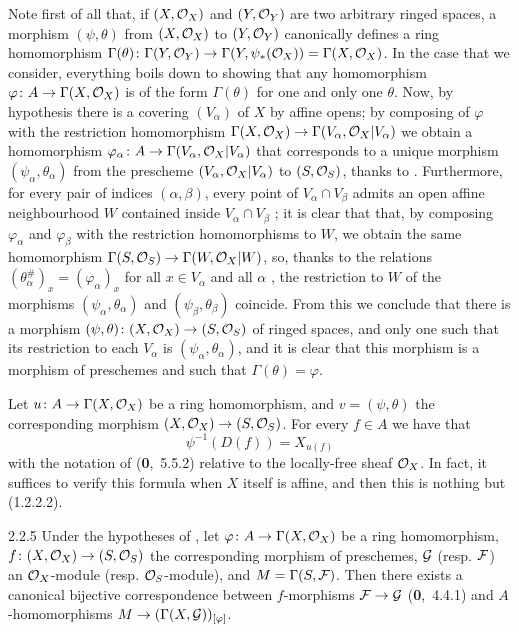 \documentclass[../main.tex]{subfiles}
\begin{document}
Note first of all that, if $(X,\mathcal{O}_X)$ and $(Y,\mathcal{O}_Y)$ are two arbitrary ringed spaces,
a morphism $(\psi,\theta)$ from $(X,\mathcal{O}_X)$ to $(Y,\mathcal{O}_Y)$ canonically defines a ring
homomorphism
$\Gamma(\theta)\colon\Gamma(Y,\mathcal{O}_Y)\to\Gamma(Y,\psi_\ast(\mathcal{O}_X))=\Gamma(X,\mathcal{O}_X)$.
In the case that we consider, everything boils down to showing that any
homomorphism $\varphi\colon A\to\Gamma(X,\mathcal{O}_X)$ is of the form $\Gamma(\theta)$
for one and only one $\theta$. Now, by hypothesis there is a covering
$(V_\alpha)$ of $X$ by affine opens; by composing of $\varphi$ with the
restriction homomorphism $\Gamma(X,\mathcal{O}_X)\to\Gamma(V_\alpha,\mathcal{O}_X|V_\alpha)$ we
obtain a homomorphism $\varphi_\alpha\colon A\to\Gamma(V_\alpha,\mathcal{O}_X|V_\alpha)$
that corresponds to a unique morphism $(\psi_\alpha,\theta_\alpha)$ from the
prescheme $(V_\alpha,\mathcal{O}_X|V_\alpha)$ to $(S,\mathcal{O}_S)$, thanks to .
Furthermore, for every pair of indices $(\alpha,\beta)$, every point of
$V_\alpha\cap V_\beta$ admits an open affine neighbourhood $W$ contained inside
$V_\alpha\cap V_\beta$ ; it is clear that that, by composing
$\varphi_\alpha$ and $\varphi_\beta$ with the restriction homomorphisms to $W$,
we obtain the same homomorphism $\Gamma(S,\mathcal{O}_S)\to\Gamma(W,\mathcal{O}_X|W)$, so, thanks
to the relations $(\theta_\alpha^\#)_x=(\varphi_\alpha)_x$ for all $x\in
V_\alpha$ and all $\alpha$ , the restriction to $W$ of the morphisms
$(\psi_\alpha,\theta_\alpha)$ and $(\psi_\beta,\theta_\beta)$ coincide. From
this we conclude that there is a morphism
$(\psi,\theta)\colon(X,\mathcal{O}_X)\to(S,\mathcal{O}_S)$ of ringed spaces, and only one such
that its restriction to each $V_\alpha$ is $(\psi_\alpha,\theta_\alpha)$, and it
is clear that this morphism is a morphism of preschemes and such that
$\Gamma(\theta)=\varphi$.

Let $u\colon A\to\Gamma(X,\mathcal{O}_X)$ be a ring homomorphism, and $v=(\psi,\theta)$
the corresponding morphism $(X,\mathcal{O}_X)\to(S,\mathcal{O}_S)$. For every $f\in A$ we have
that
\[
  \psi^{-1}(D(f))=X_{u(f)}\tag{2.2.4.1}
\]
with the notation of (\textbf{0},~5.5.2) relative to the locally-free sheaf
$\mathcal{O}_X$. In fact, it suffices to verify this formula when $X$ itself is affine,
and then this is nothing but (1.2.2.2).

\begin{env}[Proposition]{2.2.5}
Under the hypotheses of , let
$\varphi\colon A\to\Gamma(X,\mathcal{O}_X)$ be a ring homomorphism,
$f\colon(X,\mathcal{O}_X)\to(S,\mathcal{O}_S)$ the corresponding morphism of preschemes,
$\mathcal{G}$ (resp. $\mathcal{F}$) an $\mathcal{O}_X$-module (resp. $\mathcal{O}_S$-module), and
$M=\Gamma(S,\mathcal{F})$. Then there exists a canonical bijective
correspondence between $f$-morphisms $\mathcal{F}\to\mathcal{G}$
(\textbf{0},~4.4.1) and $A$-homomorphisms
$M\to(\Gamma(X,\mathcal{G}))_{[\varphi]}$.
\end{env}
\end{document}
